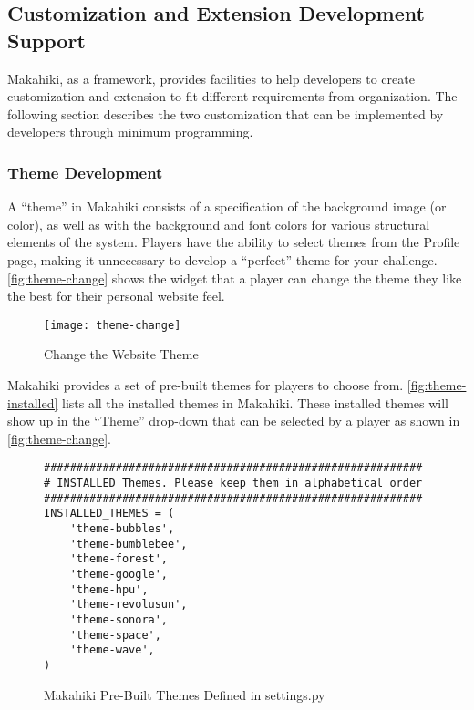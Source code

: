 \clearpage

\subsection{Customization and Extension Development Support}
Makahiki, as a framework, provides facilities to help developers to create customization and extension to fit different requirements from  organization. The following section describes the two customization that can be implemented by developers through minimum programming.

\subsubsection{Theme Development}
A ``theme'' in Makahiki consists of a specification of the background image (or color), as well as with the background and font colors for various structural elements of the system. Players have the ability to select themes from the Profile page, making it unnecessary to develop a ``perfect'' theme for your challenge. \autoref{fig:theme-change} shows the widget that a player can change the theme they like the best for their personal website feel. 

\begin{figure}[!ht]
  \center
  \texttt{[image: theme-change]}
  \caption{Change the Website Theme}
  \label{fig:theme-change}
\end{figure}

Makahiki provides a set of pre-built themes for players to choose from. \autoref{fig:theme-installed} lists all the installed themes in Makahiki. These installed themes will show up in the ``Theme'' drop-down that can be selected by a player as shown in \autoref{fig:theme-change}.

\begin{figure}[!ht]
\begin{lstlisting}
##########################################################
# INSTALLED Themes. Please keep them in alphabetical order
##########################################################
INSTALLED_THEMES = (
    'theme-bubbles',
    'theme-bumblebee',
    'theme-forest',
    'theme-google',
    'theme-hpu',
    'theme-revolusun',
    'theme-sonora',
    'theme-space',
    'theme-wave',
)
\end{lstlisting}
\caption{Makahiki Pre-Built Themes Defined in settings.py}
\label{fig:theme-installed}
\end{figure}

